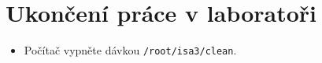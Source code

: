 \section{Ukončení práce v laboratoři}
\begin{itemize}
  \item Počítač vypněte dávkou {\tt /root/isa3/clean}.
\end{itemize}
